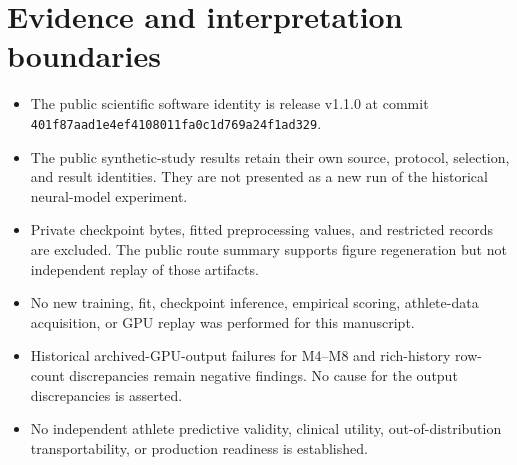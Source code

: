 \documentclass[10pt,a4paper]{article}
\begin{document}
\section{Evidence and interpretation boundaries}

\begin{itemize}
\item The public scientific software identity is release v1.1.0 at commit \texttt{401f87aad1e4ef4108011fa0c1d769a24f1ad329}.
\item The public synthetic-study results retain their own source, protocol, selection, and result identities. They are not presented as a new run of the historical neural-model experiment.
\item Private checkpoint bytes, fitted preprocessing values, and restricted records are excluded. The public route summary supports figure regeneration but not independent replay of those artifacts.
\item No new training, fit, checkpoint inference, empirical scoring, athlete-data acquisition, or GPU replay was performed for this manuscript.
\item Historical archived-GPU-output failures for M4--M8 and rich-history row-count discrepancies remain negative findings. No cause for the output discrepancies is asserted.
\item No independent athlete predictive validity, clinical utility, out-of-distribution transportability, or production readiness is established.
\end{itemize}
\end{document}
